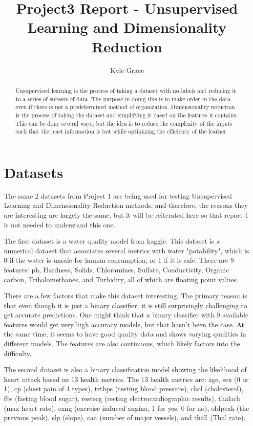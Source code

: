 \documentclass[
	letterpaper, %
]{mlreport}
\author{Kyle Grace}
\title{Project3 Report - Unsupervised Learning and Dimensionality Reduction}
\begin{document}

\maketitle

\begin{abstract}
Unsupervised learning is the process of taking a dataset with no labels and reducing it to a series of subsets of data. The purpose in doing this is to make order in the data even if there is not a predetermined method of organization. Dimensionality reduction is the process of taking the dataset and simplifying it based on the features it contains. This can be done several ways, but the idea is to reduce the complexity of the inputs such that the least information is lost while optimizing the efficiency of the learner.
\end{abstract}

\section{Datasets}
The same 2 datasets from Project 1 are being used for testing Unsupervised Learning and Dimensionality Reduction methods, and therefore, the reasons they are interesting are largely the same, but it will be reiterated here so that report 1 is not needed to understand this one.

The first dataset is a water quality model from kaggle. This dataset is a numerical dataset that associates several metrics with water "potability", which is 0 if the water is unsafe for human consumption, or 1 if it is safe. There are 9 features: ph, Hardness, Solids, Chloramines, Sulfate, Conductivity, Organic carbon, Trihalomethanes, and Turbidity, all of which are floating point values.

There are a few factors that make this dataset interesting. The primary reason is that even though it is just a binary classifier, it is still surprisingly challenging to get accurate predictions. One might think that a binary classifier with 9 available features would get very high accuracy models, but that hasn't been the case. At the same time, it seems to have good quality data and shows varying qualities in different models. The features are also continuous, which likely factors into the difficulty.

The second dataset is also a binary classification model showing the likelihood of heart attack based on 13 health metrics. The 13 health metrics are: age, sex (0 or 1), cp (chest pain of 4 types), trtbps (resting blood pressure), chol (cholesterol), fbs (fasting blood sugar), restecg (resting electrocardiographic results), thalach (max heart rate), exng (exercise induced angina, 1 for yes, 0 for no), oldpeak (the previous peak), slp (slope), caa (number of major vessels), and thall (Thal rate).
\end{document}
